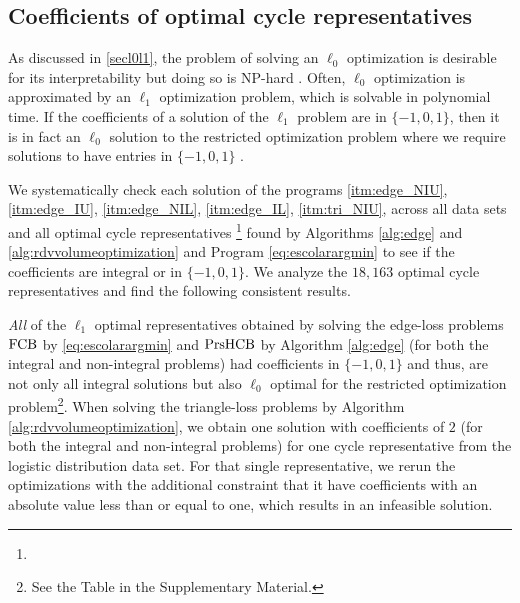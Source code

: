 \subsection{Coefficients of optimal cycle representatives}
\label{coefficient}
As discussed in \se \ref{secl0l1}, the problem of solving an $\ell_0$ optimization is desirable for its interpretability but doing so is NP-hard \cite{NPhardL0}. Often, $\ell_0$ optimization is approximated by an $\ell_1$ optimization problem, which is solvable in polynomial time. If the coefficients of a solution of the $\ell_1$ problem are in $\{-1,0,1\}$, then it is in fact an $\ell_0$ solution to the restricted optimization problem where we require solutions to have entries in $\{-1, 0, 1\}$ \cite{Escolar2016, Obayashi2018}. 

We systematically check each solution of the \DIFdelbegin {}\DIFdelend \DIFaddbegin {}\DIFaddend programs
\ref{itm:edge_NIU},
\ref{itm:edge_IU},
\ref{itm:edge_NIL},
\ref{itm:edge_IL},
\ref{itm:tri_NIU}, 
\DIFdelbegin {}\DIFdelend \DIFaddbegin {}\DIFaddend across all data sets and all optimal cycle representatives \DIFdelbegin {}\DIFdelend \DIFaddbegin {}\footnote{} \DIFaddend found by Algorithms \ref{alg:edge} and \ref{alg:rdvvolumeoptimization} and Program \eqref{eq:escolarargmin} to see if the coefficients are integral or in $\{-1,0,1\}$. We analyze the $18,163$ optimal cycle representatives and find the following consistent results.

 
 \emph{All} \DIFaddbegin {} \DIFaddend of the $\ell_1$ optimal representatives obtained by solving the edge-loss problems $\mathrm{FCB}$ by \pr \eqref{eq:escolarargmin} and $\mathrm{PrsHCB}$ by Algorithm \ref{alg:edge} (for both the integral and non-integral problems) had coefficients in $\{-1, 0, 1\}$ and thus, are not only all integral solutions but also $\ell_0$ optimal for the restricted optimization problem\footnote{See the Table in the Supplementary Material. \DIFaddbegin {}\DIFaddend }. When solving the triangle-loss problems by Algorithm \ref{alg:rdvvolumeoptimization}, we obtain one solution with coefficients of $2$ (for both the integral and non-integral problems) for one cycle representative from the logistic distribution data set. For that single representative, we rerun the optimizations with the additional constraint that it have coefficients with an absolute value less than or equal to one, which results in an infeasible solution. 

